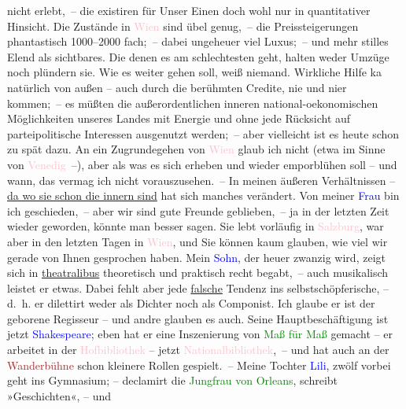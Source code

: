                nicht erlebt, – die existiren für Unser Einen doch wohl nur in quantitativer
               Hinsicht.\pend
           \pstart
           Die Zustände in \textcolor{pink}{Wien}{}\ledrightnote{\textcolor{pink}{Wien}} sind übel genug, – die
               Preissteigerungen phantastisch 1000–2000 fach; – dabei ungeheuer viel Luxus; – und
               mehr stilles Elend als sichtbares. Die denen es am schlechtesten geht, halten weder
               Umzüge noch plündern sie. Wie es weiter gehen soll, weiß niemand. Wirkliche {\pb}Hilfe ka{\geminationn} natürlich
               von außen – auch durch die berühmten Credite, nie und ni{\geminationm}er kommen; – es müßten die außerordentlichen inneren \introOben{}national-\introOben{}oekonomischen Möglichkeiten unseres Landes mit Energie und ohne
               jede Rücksicht auf \introOben{}partei\introOben{}politische  Interessen ausgenutzt werden; – aber vielleicht ist
               es heute schon zu spät dazu. An ein Zugrundegehen von \textcolor{pink}{Wien}{}\ledrightnote{\textcolor{pink}{Wien}} glaub ich nicht (etwa im Sinne von \textcolor{pink}{Venedig}{}\ledrightnote{\textcolor{pink}{Venedig}} –), aber als was es sich erheben und wieder emporblühen soll – und
               wann, das vermag ich nicht vorauszusehen. –\pend
           \pstart
           In meinen äußeren Verhältnissen – \uline{da wo sie schon die
                  innern sind} hat sich manches verändert. Von meiner \textcolor{blue}{Frau}{} bin ich geschieden, – aber wir sind gute
               Freunde geblieben, – ja in der letzten Zeit wieder geworden, könnte man besser sagen.
               Sie lebt vorläufig in \textcolor{pink}{Salzburg}{}\ledrightnote{\textcolor{pink}{Salzburg}}, war aber in den
               letzten Tagen in \textcolor{pink}{Wien}{}\ledrightnote{\textcolor{pink}{Wien}}, und Sie können kaum glauben,
               wie viel wir gerade von Ihnen gesprochen haben. Mein \textcolor{blue}{Sohn}{}, der {\pb}heuer zwanzig
               wird, zeigt sich in \uline{theatralibus} theoretisch und
               praktisch recht begabt, – auch musikalisch leistet er etwas. Dabei fehlt aber jede
                  \uline{falsche} Tendenz ins selbstschöpferische, – d. h.
               er dilettirt weder als Dichter noch als Componist. Ich glaube er ist der geborene
               Regisseur – und andre glauben es auch. Seine Hauptbeschäftigung ist jetzt \textcolor{blue}{Shakespeare}{}\ledrightnote{\textcolor{blue}{William Shakespeare}}; eben hat er eine Inszenierung von \textcolor{green}{Maß für Maß}{}\ledrightnote{\textcolor{green}{Maß für Maß}} gemacht – er arbeitet in der \textcolor{pink}{Hofbibliothek}{}\ledrightnote{\textcolor{pink}{Nationalbibliothek}} – jetzt \textcolor{pink}{Nationalbibliothek}{}\ledrightnote{\textcolor{pink}{Nationalbibliothek}}, – und hat auch an der \textcolor{brown}{Wanderbühne}{}\ledrightnote{\textcolor{brown}{Wanderbühne des österreichischen Volksbildungsamtes}} schon kleinere Rollen gespielt. – Meine Tochter \textcolor{blue}{Lili}{}\ledrightnote{\textcolor{blue}{Lili Schnitzler}}, zwölf vorbei geht ins Gymnasium; – declamirt die \textcolor{green}{Jungfrau von Orleans}{}\ledrightnote{\textcolor{green}{Die Jungfrau von Orleans}}, schreibt »Geschichten«, – und

